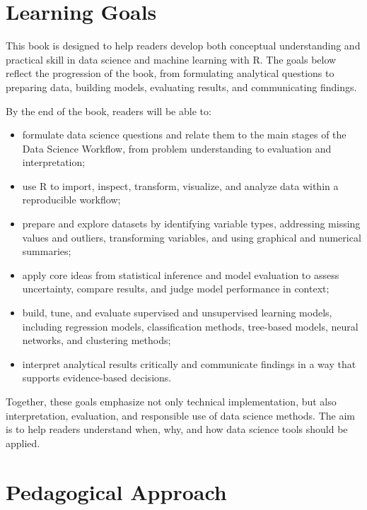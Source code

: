 \documentclass[
  letterpaper,
]{svmono}
\numberwithin{example}{subsection}
\begin{document}
\section*{Learning Goals}\label{learning-goals}


This book is designed to help readers develop both conceptual
understanding and practical skill in data science and machine learning
with R. The goals below reflect the progression of the book, from
formulating analytical questions to preparing data, building models,
evaluating results, and communicating findings.

By the end of the book, readers will be able to:

\begin{itemize}
\item
  formulate data science questions and relate them to the main stages of
  the Data Science Workflow, from problem understanding to evaluation
  and interpretation;
\item
  use R to import, inspect, transform, visualize, and analyze data
  within a reproducible workflow;
\item
  prepare and explore datasets by identifying variable types, addressing
  missing values and outliers, transforming variables, and using
  graphical and numerical summaries;
\item
  apply core ideas from statistical inference and model evaluation to
  assess uncertainty, compare results, and judge model performance in
  context;
\item
  build, tune, and evaluate supervised and unsupervised learning models,
  including regression models, classification methods, tree-based
  models, neural networks, and clustering methods;
\item
  interpret analytical results critically and communicate findings in a
  way that supports evidence-based decisions.
\end{itemize}

Together, these goals emphasize not only technical implementation, but
also interpretation, evaluation, and responsible use of data science
methods. The aim is to help readers understand when, why, and how data
science tools should be applied.

\section*{Pedagogical Approach}\label{pedagogical-approach}
\end{document}
